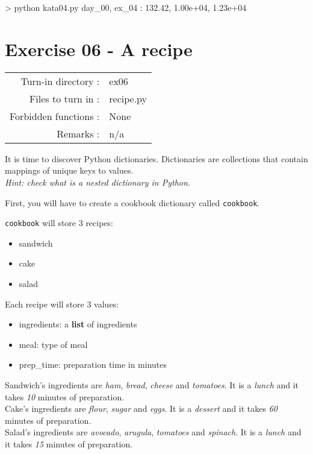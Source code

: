 \documentclass[]{article}
\newenvironment{Shaded}{\begin{snugshade}}{\end{snugshade}}
\newcommand{\NormalTok}[1]{\textcolor[rgb]{0.81,0.81,0.76}{#1}}
\begin{document}
\begin{Shaded}
\begin{Highlighting}[]
\NormalTok{> python kata04.py}
\NormalTok{day_00, ex_04 : 132.42, 1.00e+04, 1.23e+04}
\end{Highlighting}
\end{Shaded}

\clearpage

\hypertarget{exercise-06---a-recipe-1}{%
\section{Exercise 06 - A recipe}\label{exercise-06---a-recipe-1}}

\begin{longtable}[]{@{}rl@{}}
\toprule
\endhead
Turn-in directory : & ex06\tabularnewline
Files to turn in : & recipe.py\tabularnewline
Forbidden functions : & None\tabularnewline
Remarks : & n/a\tabularnewline
\bottomrule
\end{longtable}

It is time to discover Python dictionaries. Dictionaries are collections
that contain mappings of unique keys to values.\\
\emph{Hint: check what is a nested dictionary in Python.}

First, you will have to create a cookbook dictionary called
\texttt{cookbook}.

\texttt{cookbook} will store 3 recipes:

\begin{itemize}
\item
  sandwich
\item
  cake
\item
  salad
\end{itemize}

Each recipe will store 3 values:

\begin{itemize}
\item
  ingredients: a \textbf{list} of ingredients
\item
  meal: type of meal
\item
  prep\_time: preparation time in minutes
\end{itemize}

Sandwich's ingredients are \emph{ham}, \emph{bread}, \emph{cheese} and
\emph{tomatoes}. It is a \emph{lunch} and it takes \emph{10} minutes of
preparation.\\
Cake's ingredients are \emph{flour}, \emph{sugar} and \emph{eggs}. It is
a \emph{dessert} and it takes \emph{60} minutes of preparation.\\
Salad's ingredients are \emph{avocado}, \emph{arugula}, \emph{tomatoes}
and \emph{spinach}. It is a \emph{lunch} and it takes \emph{15} minutes
of preparation.
\end{document}
